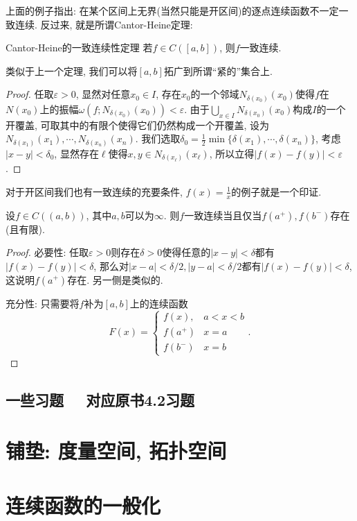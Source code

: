 上面的例子指出: 在某个区间上无界(当然只能是开区间)的逐点连续函数不一定一致连续. 反过来, 就是所谓Cantor-Heine定理: 

\begin{theorem}{Cantor-Heine的一致连续性定理}
	若$f \in C([a,b])$, 则$f$一致连续. 
\end{theorem}
\begin{remark}
	类似于上一个定理, 我们可以将$[a,b]$拓广到所谓“紧的”集合上. 
\end{remark}
\begin{proof}
	任取$\varepsilon >0$, 显然对任意$x_0 \in I$, 存在$x_0$的一个邻域$N_{\delta(x_0)}(x_0)$使得$f$在$N(x_0)$上的振幅$\omega (f;N_{\delta(x_0)}(x_0)) <\varepsilon$. 由于$\bigcup_{x \in I} N_{\delta(x_0)}(x_0)$构成$I$的一个开覆盖, 可取其中的有限个使得它们仍然构成一个开覆盖, 设为$N_{\delta (x_1)}(x_1), \cdots ,N_{\delta (x_n)}(x_n)$. 我们选取$\delta _0 = \frac{1}{2}\min \{ \delta (x_1),\cdots ,\delta (x_n) \}$, 考虑$|x-y|<\delta _0$, 显然存在$\ell$使得$x,y \in N_{\delta (x_{\ell})}(x_{\ell})$, 所以立得$|f(x)-f(y)|<\varepsilon$. 
\end{proof}

对于开区间我们也有一致连续的充要条件, $f(x)=\frac{1}{x}$的例子就是一个印证. 

\begin{proposition}{}
	设$f \in C((a,b))$, 其中$a,b$可以为$\infty$. 则$f$一致连续当且仅当$f(a^+),f(b^-)$存在(且有限). 
\end{proposition}
\begin{proof}
	必要性: 任取$\varepsilon >0$则存在$\delta >0$使得任意的$|x-y|<\delta$都有$|f(x)-f(y)|<\delta$, 那么对$|x-a|<\delta /2, |y-a|<\delta /2$都有$|f(x)-f(y)|<\delta$, 这说明$f(a^+)$存在. 另一侧是类似的. 
	
	充分性: 只需要将$f$补为$[a,b]$上的连续函数$$F(x)=\begin{cases}
 f(x), & a<x<b \\
 f(a^+) & x=a \\
 f(b^-) & x=b
\end{cases}.$$
\end{proof}

\newpage
\subsection*{一些习题 ~~\small 对应原书4.2习题}
















\newpage
\section{铺垫: 度量空间, 拓扑空间}

\section{连续函数的一般化}












